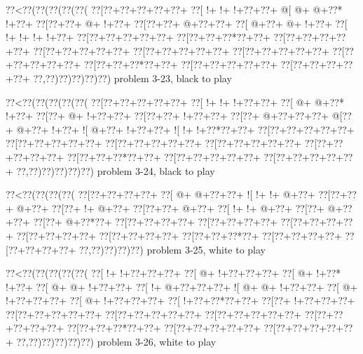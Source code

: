 \vbox{\vbox{\goo
\0??<\0??(\0??(\0??(\0??(\0??(
\0??[\0??+\0??+\0??+\0??+\0??+
\0??[\- !+\- !+\- !+\0??+\0??+
\- @[\- @+\- @+\0??*\- !+\0??+
\0??[\0??+\0??+\- @+\- !+\0??+
\0??[\0??+\0??+\- @+\0??+\0??+
\0??[\- @+\0??+\- @+\- !+\0??+
\0??[\- !+\- !+\- !+\- !+\0??+
\0??[\0??+\0??+\0??+\0??+\0??+
\0??[\0??+\0??+\0??*\0??+\0??+
\0??[\0??+\0??+\0??+\0??+\0??+
\0??[\0??+\0??+\0??+\0??+\0??+
\0??[\0??+\0??+\0??+\0??+\0??+
\0??[\0??+\0??+\0??+\0??+\0??+
\0??[\0??+\0??+\0??+\0??+\0??+
\0??[\0??+\0??+\0??*\0??+\0??+
\0??[\0??+\0??+\0??+\0??+\0??+
\0??[\0??+\0??+\0??+\0??+\0??+
\0??,\0??)\0??)\0??)\0??)\0??)
}
\hfil problem 3-23, black to play\hfil\break
}

\vbox{\vbox{\goo
\0??<\0??(\0??(\0??(\0??(\0??(
\0??[\0??+\0??+\0??+\0??+\0??+
\0??[\- !+\- !+\- !+\0??+\0??+
\0??[\- @+\- @+\0??*\- !+\0??+
\0??[\0??+\- @+\- !+\0??+\0??+
\0??[\0??+\0??+\- !+\0??+\0??+
\0??[\0??+\- @+\0??+\0??+\0??+
\- @[\0??+\- @+\0??+\- !+\0??+
\- ![\- @+\0??+\- !+\0??+\0??+
\- ![\- !+\- !+\0??*\0??+\0??+
\0??[\0??+\0??+\0??+\0??+\0??+
\0??[\0??+\0??+\0??+\0??+\0??+
\0??[\0??+\0??+\0??+\0??+\0??+
\0??[\0??+\0??+\0??+\0??+\0??+
\0??[\0??+\0??+\0??+\0??+\0??+
\0??[\0??+\0??+\0??*\0??+\0??+
\0??[\0??+\0??+\0??+\0??+\0??+
\0??[\0??+\0??+\0??+\0??+\0??+
\0??,\0??)\0??)\0??)\0??)\0??)
}
\hfil problem 3-24, black to play\hfil\break
}

\vbox{\vbox{\goo
\0??<\0??(\0??(\0??(\0??(
\0??[\0??+\0??+\0??+\0??+
\0??[\- @+\- @+\0??+\0??+
\- ![\- !+\- !+\- @+\0??+
\0??[\0??+\0??+\- @+\0??+
\0??[\0??+\- !+\- @+\0??+
\0??[\0??+\0??+\- @+\0??+
\0??[\- !+\- !+\- @+\0??+
\0??[\0??+\- @+\0??+\0??+
\0??[\0??+\- @+\0??*\0??+
\0??[\0??+\0??+\0??+\0??+
\0??[\0??+\0??+\0??+\0??+
\0??[\0??+\0??+\0??+\0??+
\0??[\0??+\0??+\0??+\0??+
\0??[\0??+\0??+\0??+\0??+
\0??[\0??+\0??+\0??*\0??+
\0??[\0??+\0??+\0??+\0??+
\0??[\0??+\0??+\0??+\0??+
\0??,\0??)\0??)\0??)\0??)
}
\hfil problem 3-25, white to play\hfil\break
}

\vbox{\vbox{\goo
\0??<\0??(\0??(\0??(\0??(\0??(
\0??[\- !+\- !+\0??+\0??+\0??+
\0??[\- @+\- !+\0??+\0??+\0??+
\0??[\- @+\- !+\0??*\- !+\0??+
\0??[\- @+\- @+\- !+\0??+\0??+
\0??[\- !+\- @+\0??+\0??+\0??+
\- ![\- @+\- @+\- !+\0??+\0??+
\0??[\- @+\- !+\0??+\0??+\0??+
\0??[\- @+\- !+\0??+\0??+\0??+
\0??[\- !+\0??+\0??*\0??+\0??+
\0??[\0??+\- !+\0??+\0??+\0??+
\0??[\0??+\0??+\0??+\0??+\0??+
\0??[\0??+\0??+\0??+\0??+\0??+
\0??[\0??+\0??+\0??+\0??+\0??+
\0??[\0??+\0??+\0??+\0??+\0??+
\0??[\0??+\0??+\0??*\0??+\0??+
\0??[\0??+\0??+\0??+\0??+\0??+
\0??[\0??+\0??+\0??+\0??+\0??+
\0??,\0??)\0??)\0??)\0??)\0??)
}
\hfil problem 3-26, white to play\hfil\break
}

